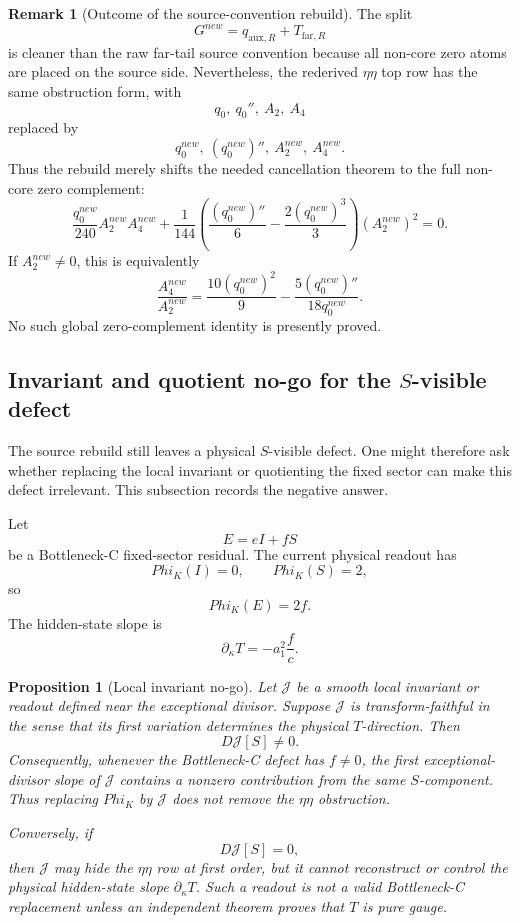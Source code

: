 \documentclass[11pt,a4paper]{amsart}
\def\Phi{Phi}%
\def\new{new}%
\theoremstyle{plain}
\newtheorem{proposition}[theorem]{Proposition}
\theoremstyle{definition}
\newtheorem{remark}[theorem]{Remark}
\newcommand{\new}{\mathrm{new}}
\begin{document}
\begin{remark}[Outcome of the source-convention rebuild]
\label{rem:outcome-source-convention-rebuild}
The split
\[
G^{\new}=q_{\mathrm{aux},R}+T_{\mathrm{far},R}
\]
is cleaner than the raw far-tail source convention because all non-core zero
atoms are placed on the source side.  Nevertheless, the rederived
\(\eta\eta\) top row has the same obstruction form, with
\[
q_0,\ q_0'',\ A_2,\ A_4
\]
replaced by
\[
q_0^{\new},\ (q_0^{\new})'',\ A_2^{\new},\ A_4^{\new}.
\]
Thus the rebuild merely shifts the needed cancellation theorem to the full
non-core zero complement:
\[
\frac{q_0^{\new}}{240}A_2^{\new}A_4^{\new}
+
\frac{1}{144}
\left(
\frac{(q_0^{\new})''}{6}
-
\frac{2(q_0^{\new})^3}{3}
\right)
(A_2^{\new})^2
=
0.
\]
If \(A_2^{\new}\ne0\), this is equivalently
\[
\frac{A_4^{\new}}{A_2^{\new}}
=
\frac{10(q_0^{\new})^2}{9}
-
\frac{5(q_0^{\new})''}{18q_0^{\new}}.
\]
No such global zero-complement identity is presently proved.
\end{remark}

\subsection{Invariant and quotient no-go for the \(S\)-visible defect}
\label{subsec:invariant-quotient-no-go-s-visible-defect}

The source rebuild still leaves a physical \(S\)-visible defect.  One might
therefore ask whether replacing the local invariant or quotienting the fixed
sector can make this defect irrelevant.  This subsection records the negative
answer.

Let
\[
E=eI+fS
\]
be a Bottleneck-C fixed-sector residual.  The current physical readout has
\[
\Phi_K(I)=0,\qquad \Phi_K(S)=2,
\]
so
\[
\Phi_K(E)=2f.
\]
The hidden-state slope is
\[
\partial_\kappa T=-a_1^2\frac{f}{c}.
\]

\begin{proposition}[Local invariant no-go]
\label{prop:local-invariant-no-go-bc}
Let \(\mathcal J\) be a smooth local invariant or readout defined near the
exceptional divisor.  Suppose \(\mathcal J\) is transform-faithful in the sense
that its first variation determines the physical \(T\)-direction.  Then
\[
D\mathcal J[S]\ne0.
\]
Consequently, whenever the Bottleneck-C defect has \(f\ne0\), the first
exceptional-divisor slope of \(\mathcal J\) contains a nonzero contribution
from the same \(S\)-component.  Thus replacing \(\Phi_K\) by
\(\mathcal J\) does not remove the \(\eta\eta\) obstruction.

Conversely, if
\[
D\mathcal J[S]=0,
\]
then \(\mathcal J\) may hide the \(\eta\eta\) row at first order, but it cannot
reconstruct or control the physical hidden-state slope
\(\partial_\kappa T\).  Such a readout is not a valid Bottleneck-C replacement
unless an independent theorem proves that \(T\) is pure gauge.
\end{proposition}
\end{document}
